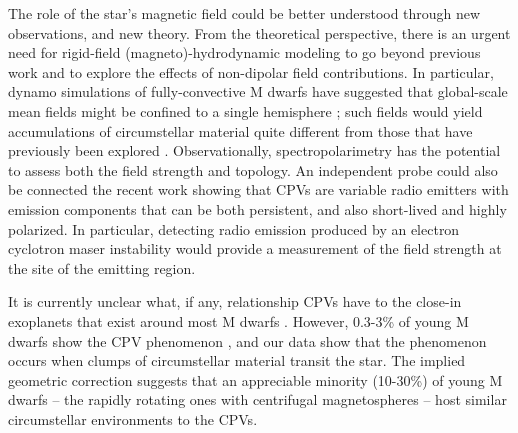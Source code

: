 \documentclass{nature3}
\begin{document}
The role of the star's magnetic field could be better understood
through new observations, and new theory.  From the theoretical
perspective, there is an urgent need for rigid-field
(magneto)-hydrodynamic modeling to go beyond previous work
\cite{Townsend2005,Townsend2008} and to explore the effects of
non-dipolar field contributions.
In particular, dynamo simulations of fully-convective M dwarfs have
suggested that global-scale mean fields might be
confined to a single hemisphere \cite{Brown2020}; such fields would
yield accumulations of circumstellar material quite different
from those that have previously been explored \cite{Townsend2008}.
Observationally, spectropolarimetry has the potential to
assess both the field strength and topology.  An independent
probe could also be connected the recent work \cite{Kaur2024} showing
that CPVs are variable radio emitters with emission components
that can be both persistent, and also short-lived and highly
polarized.  In particular, detecting radio emission produced by an electron
cyclotron maser instability would provide a measurement of the field
strength at the site of the emitting region.

It is currently unclear what, if any, relationship CPVs have to the
close-in exoplanets that exist around most M dwarfs
\cite{Dressing2015}.  However, 0.3-3\% of young M dwarfs show the CPV
phenomenon \cite{Rebull2020}, and our data show that the phenomenon
occurs when clumps of circumstellar material transit the star.  The
implied geometric correction suggests that an appreciable minority
(10-30\%) of young M dwarfs -- the rapidly rotating ones with
centrifugal magnetospheres -- host similar circumstellar environments
to the CPVs.




\end{document}
